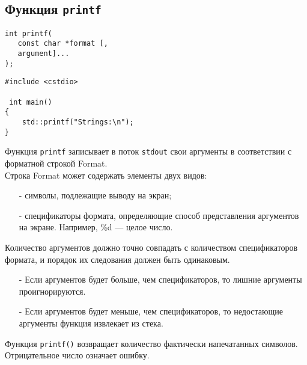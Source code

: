 \documentclass {article}
\begin{document}
\subsection{Функция \texttt{printf}}
\begin{lstlisting}[caption=Пример синтаксиса]
int printf(  
   const char *format [,  
   argument]...   
);  
\end{lstlisting}
\begin{lstlisting}[caption=Пример]
#include <cstdio>
 
 int main()
{
    std::printf("Strings:\n");
}
\end{lstlisting}
Функция \texttt{printf} записывает в поток \texttt{stdout} свои аргументы в соответствии с форматной строкой Format.\\
Строка Format может содержать элементы двух видов:
\begin{itemize}
\item[-] символы, подлежащие выводу на экран;
\item[-] спецификаторы формата, определяющие способ представления аргументов на экране. Например, \%d --- целое число.
\end{itemize}
Количество аргументов должно точно совпадать с количеством спецификаторов формата, и порядок их следования должен быть одинаковым.
\begin{itemize}
\item[-] Если аргументов будет больше, чем спецификаторов, то лишние аргументы проигнорируются.
\item[-] Если аргументов будет меньше, чем спецификаторов, то недостающие аргументы функция извлекает из стека.
\end{itemize}
Функция \texttt{printf()} возвращает количество фактически напечатанных символов. Отрицательное число означает ошибку.
\end{document}
